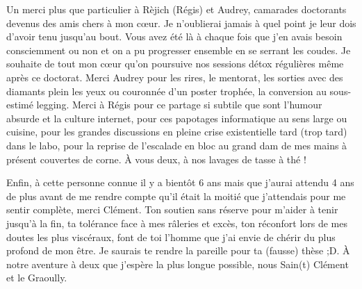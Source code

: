 Un merci plus que particulier à Rèjich (Régis) et Audrey, camarades doctorants devenus des amis chers à mon cœur. Je n'oublierai jamais à quel point je leur dois d'avoir tenu jusqu'au bout. Vous avez été là à chaque fois que j'en avais besoin consciemment ou non et on a pu progresser ensemble en se serrant les coudes. Je souhaite de tout mon cœur qu'on poursuive nos sessions détox régulières même après ce doctorat. Merci Audrey pour les rires, le mentorat, les sorties avec des diamants plein les yeux ou couronnée d'un poster trophée, la conversion au sous-estimé legging. Merci à Régis pour ce partage si subtile que sont l'humour absurde et la culture internet, pour ces papotages informatique au sens large ou cuisine, pour les grandes discussions en pleine crise existentielle tard (trop tard) dans le labo, pour la reprise de l'escalade en bloc au grand dam de mes mains à présent couvertes de corne. À vous deux, à nos lavages de tasse à thé !

Enfin, à cette personne connue il y a bientôt 6 ans mais que j'aurai attendu 4 ans de plus avant de me rendre compte qu'il était la moitié que j'attendais pour me sentir complète, merci Clément. Ton soutien sans réserve pour m'aider à tenir jusqu'à la fin, ta tolérance face à mes râleries et excès, ton réconfort lors de mes doutes les plus viscéraux, font de toi l'homme que j'ai envie de chérir du plus profond de mon être. Je saurais te rendre la pareille pour ta (fausse) thèse ;D. À notre aventure à deux que j'espère la plus longue possible, nous Sain(t) Clément et le Graoully.